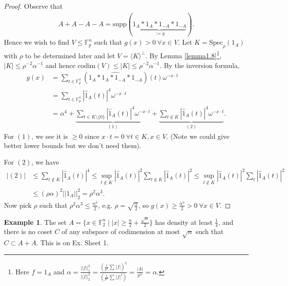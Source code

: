 \documentclass{article}
\theoremstyle{definition}
\newtheorem{example}[theorem]{Example}
\begin{document}
\begin{proof}
    Observe that 
    \begin{align*}
        A+A-A-A = \text{supp}(\underbrace{1_A * 1_A * 1_{-A} * 1_{-A}}_{:= g}).
    \end{align*}
    Hence we wish to find $V \le \mathbb{F}_p^n$ such that $g(x) > 0 ~\forall x \in V$. Let $K = \text{Spec}_{\rho}(1_A)$ with $\rho$ to be determined later and let $V = \langle K \rangle^{\perp}$. By Lemma \ref{lemma1.8}\footnote{Here $f = 1_A$ and $\alpha = \frac{||f||_1^2}{||f||_2^2} = \frac{\left(\frac{1}{p^n}\sum_{}^{} |f|\right)^2}{\left(\frac{1}{p^n}\sum_{}^{} |f|^2\right)} = \frac{|A|}{p^n} = \alpha$.}, $|K|\le \rho^{-2}\alpha^{-1}$ and hence $\text{codim}(V)\le |K| \le \rho^{-2}\alpha^{-1}$. By the inversion formula, 
    \begin{align*}
        g(x) &= \sum_{t \in \mathbb{F}_p^n}^{} (\widehat{1_A * 1_A * 1_{-A} * 1_{-A}})(t)\omega^{-x\cdot t} \\
        &= \sum_{t \in \mathbb{F}_p^n}^{} |\hat{1}_A(t)|^4 \omega^{-x\cdot t} \\
        &= \alpha^4 + \underbrace{\sum_{t \in K \setminus \{0\}}^{} |\hat{1}_A(t)|^4 \omega^{-x \cdot t}}_{(1)} + \underbrace{\sum_{t \not\in K}^{} |\hat{1}_A(t)|^4 \omega^{-x \cdot t}}_{(2)}.
    \end{align*}
    For $(1)$, we see it is $\ge 0$ since $x \cdot t = 0 ~\forall t \in K, x \in V$. (Note we could give better lower bounds but we don't need them).
    \vspace{1mm}
     
    For $(2)$, we have 
    \begin{align*}
        |(2)| &\le \sum_{t \not\in K}^{} |\hat{1}_A(t)|^4 \le \sup_{t \not\in K} |\hat{1}_A(t)|^2 \sum_{t \not\in K}^{} |\hat{1}_A(t)|^2 \le \sup_{t \not\in K} |\hat{1}_A(t)|^2 \sum_{t}^{} |\hat{1}_A(t)|^2 \\
        &\le (\rho \alpha)^2 ||1_A||_2^2 = \rho^2 \alpha^3.
    \end{align*}
    Now pick $\rho$ such that $\rho^2 \alpha^3 \le \frac{\alpha^4}{2}$, e.g. $\rho = \sqrt{\frac{\alpha}{2}}$, so $g(x) \ge \frac{\alpha^4}{2}>0 ~\forall x \in V$.
\end{proof}
\begin{example}
    The set $A = \{x \in \mathbb{F}_2^n \mid |x|\ge \frac{n}{2}+\frac{\sqrt{n}}{2}\}$ has density at least $\frac{1}{4}$, and there is no coset $C$ of any subspace of codimension at most $\sqrt{n}$ such that $C \subset A + A$. This is on Ex. Sheet 1.
\end{example}
\end{document}
